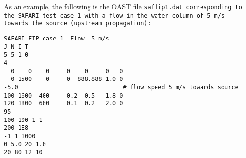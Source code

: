 As an example, the following is the OAST file \tt saffip1.dat \rm
corresponding to the SAFARI test case 1 with
a flow in the water column of 5 m/s towards the source (upstream propagation):

\begin{verbatim}
SAFARI FIP case 1. Flow -5 m/s.
J N I T
5 5 1 0
4
  0    0    0     0    0     0   0
  0 1500    0     0 -888.888 1.0 0
-5.0                              # flow speed 5 m/s towards source
100 1600  400     0.2  0.5   1.8 0
120 1800  600     0.1  0.2   2.0 0
95
100 100 1 1
200 1E8
-1 1 1000
0 5.0 20 1.0
20 80 12 10
\end{verbatim}



